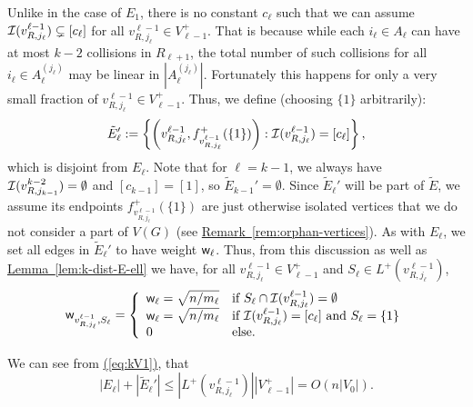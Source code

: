 \documentclass{article}
\newcommand{\eq}[1]{\hyperref[eq:#1]{(\ref*{eq:#1})}}
\newcommand{\lem}[1]{\hyperref[lem:#1]{Lemma~\ref*{lem:#1}}}
\newcommand{\rem}[1]{\hyperref[rem:#1]{Remark~\ref*{rem:#1}}}
\renewcommand{\>}{\rangle}
\newcommand{\<}{\langle}
\renewcommand{\(}{\left(}
\renewcommand{\)}{\right)}
\def\abs#1{\left| #1 \right|}
\def\w{{\sf w}}
\begin{document}
Unlike in the case of $E_1$, there is no constant $c_{\ell}$ such that we can assume ${\cal I}(v_{R,j_{\ell}}^{\ell-1})\subsetneq [c_{\ell}]$ for all $v_{R,j_{\ell}}^{\ell-1}\in V_{\ell-1}^+$. That is because while each $i_{\ell}\in A_{\ell}$ can have at most $k-2$ collisions in $R_{\ell+1}$, the total number of such collisions for all $i_{\ell}\in A_{\ell}^{(j_{\ell})}$ may be linear in $|A_{\ell}^{(j_{\ell})}|$. Fortunately this happens for only a very small fraction of $v_{R,j_{\ell}}^{\ell-1}\in V_{\ell-1}^+$. Thus, we define (choosing $\{1\}$ arbitrarily):
\begin{equation}
	\tilde{E}_{\ell}':=\left\{\left(v^{\ell-1}_{R,j_{\ell}},f^+_{v^{\ell-1}_{R,j_{\ell}}}(\{1\})\right): {\cal I}(v^{\ell-1}_{R,j_{\ell}})=[c_{\ell}]\right\},\label{eq:k-dist-tilde-E-prime}
\end{equation}
which is disjoint from $E_{\ell}$. Note that for $\ell=k-1$, we always have ${\cal I}(v^{k-2}_{R,j_{k-1}})=\emptyset$ and $[c_{k-1}]=[1]$, so $\tilde{E}_{k-1}'=\emptyset$.
Since $\tilde{E}_{\ell}'$ will be part of $\tilde{E}$, we assume its endpoints $f^+_{v^{\ell-1}_{R,j_{\ell}}}(\{1\})$ are just otherwise isolated vertices that we do not consider a part of $V(G)$ (see \rem{orphan-vertices}). As with $E_{\ell}$, we set all edges in $\tilde{E}_{\ell}'$ to have weight $\w_{\ell}$. Thus, from this discussion as well as \lem{k-dist-E-ell} we have,
for all $v^{\ell-1}_{R,j_{\ell}}\in V_{\ell-1}^+$ and $S_{\ell}\in L^+(v^{\ell-1}_{R,j_{\ell}})$,
\begin{equation}
\w_{v^{\ell-1}_{R,j_{\ell}},S_{\ell}} = \left\{\begin{array}{ll}
\w_{\ell} =\sqrt{n/m_{\ell}} & \mbox{if }S_{\ell}\cap {\cal I}(v^{\ell-1}_{R,j_{\ell}}) = \emptyset\\
\w_{\ell} =\sqrt{n/m_{\ell}} & \mbox{if }{\cal I}(v^{\ell-1}_{R,j_{\ell}})=[c_{\ell}]\mbox{ and }S_{\ell}=\{1\}\\
0 & \mbox{else.}
\end{array}\right.\label{eq:k-dist-w-ell-cond}
\end{equation}


\noindent We can see from \eq{kV1}, that 
\begin{equation}
	\abs{E_{\ell}}+\abs{\tilde{E}_{\ell}'} \leq \abs{L^+(v_{R,j_{\ell}}^{\ell-1})}\abs{V_{\ell-1}^+} = O\left(n\abs{V_0}\right).\label{eq:kEk1}
\end{equation}
\end{document}
